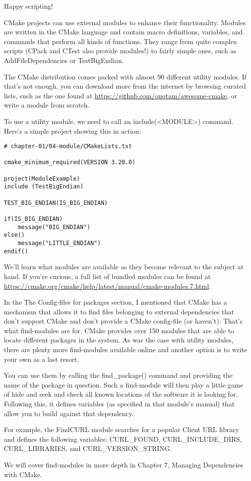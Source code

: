 Happy scripting!


CMake projects can use external modules to enhance their functionality. Modules are written in the CMake language and contain macro definitions, variables, and commands that perform all kinds of functions. They range from quite complex scripts (CPack and CTest also provide modules!) to fairly simple ones, such as AddFileDependencies or TestBigEndian.

The CMake distribution comes packed with almost 90 different utility modules. If that's not enough, you can download more from the internet by browsing curated lists, such as the one found at \url{https://github.com/onqtam/awesome-cmake}, or write a module from scratch.

To use a utility module, we need to call an include(<MODULE>) command. Here's a simple project showing this in action:

\begin{lstlisting}[style=styleCMake]	
# chapter-01/04-module/CMakeLists.txt
	
cmake_minimum_required(VERSION 3.20.0)

project(ModuleExample)
include (TestBigEndian)

TEST_BIG_ENDIAN(IS_BIG_ENDIAN)

if(IS_BIG_ENDIAN)
	message("BIG_ENDIAN")
else()
	message("LITTLE_ENDIAN")
endif()
\end{lstlisting}

We'll learn what modules are available as they become relevant to the subject at hand. If you're curious, a full list of bundled modules can be found at \url{https://cmake.org/cmake/help/latest/manual/cmake-modules.7.html}.


In the The Config-files for packages section, I mentioned that CMake has a mechanism that allows it to find files belonging to external dependencies that don't support CMake and don't provide a CMake config-file (or haven't). That's what find-modules are for. CMake provides over 150 modules that are able to locate different packages in the system. As was the case with utility modules, there are plenty more find-modules available online and another option is to write your own as a last resort.

You can use them by calling the find\_package() command and providing the name of the package in question. Such a find-module will then play a little game of hide and seek and check all known locations of the software it is looking for. Following this, it defines variables (as specified in that module's manual) that allow you to build against that dependency.

For example, the FindCURL module searches for a popular Client URL library and defines the following variables: CURL\_FOUND, CURL\_INCLUDE\_DIRS, CURL\_LIBRARIES, and CURL\_VERSION\_STRING.

We will cover find-modules in more depth in Chapter 7, Managing Dependencies with CMake.







